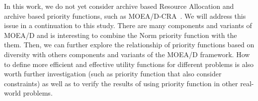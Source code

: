 In this work, we do not yet consider archive based Resource Allocation and archive based priority functions, such as MOEA/D-CRA~\cite{kang2018collaborative}. We will address this issue in a continuation to this study. There are many components and variants of MOEA/D and is interesting to combine the Norm priority function with the them. Then, we can further explore the relationship of priority functions based on diversity with others components and variants of the MOEA/D framework. How to define more efficient and effective utility functions for different problems is also worth further investigation (such as priority function that also consider constraints) as well as to verify the results of using priority function in other real-world problems.
%
